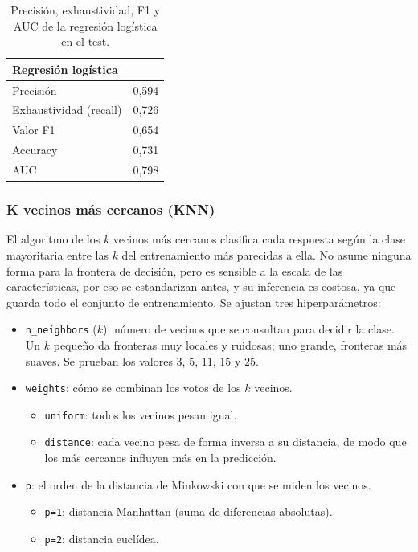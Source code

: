 \documentclass[12pt,a4paper]{report}
\theoremstyle{definition}
\newcommand{\tc}[1]{\texttt{#1}}
\begin{document}
\begin{table}[H]
\centering\small
\begin{tabular}{lc}
\toprule
Regresión logística & \\
\midrule
Precisión & 0,594 \\
Exhaustividad (recall) & 0,726 \\
Valor F1 & 0,654 \\
Accuracy & 0,731 \\
AUC & 0,798 \\
\bottomrule
\end{tabular}
\caption{Precisión, exhaustividad, F1 y AUC de la regresión logística en el test.}
\label{tab:met-lr}
\end{table}


\subsubsection{K vecinos más cercanos (KNN)}

El algoritmo de los $k$ vecinos más cercanos clasifica cada respuesta según la clase
mayoritaria entre las $k$ del entrenamiento más parecidas a ella. No
asume ninguna forma para la frontera de decisión, pero es sensible a la escala de las
características, por eso se estandarizan antes, y su inferencia es costosa, ya que guarda todo
el conjunto de entrenamiento. Se ajustan tres hiperparámetros:

\begin{itemize}
\item \tc{n\_neighbors} ($k$): número de vecinos que se consultan para decidir la clase. Un
$k$ pequeño da fronteras muy locales y ruidosas; uno grande, fronteras más suaves. Se prueban
los valores $3$, $5$, $11$, $15$ y $25$.
\item \tc{weights}: cómo se combinan los votos de los $k$ vecinos.
  \begin{itemize}
  \item \tc{uniform}: todos los vecinos pesan igual.
  \item \tc{distance}: cada vecino pesa de forma inversa a su distancia, de modo que los más
  cercanos influyen más en la predicción.
  \end{itemize}
\item \tc{p}: el orden de la distancia de Minkowski con que se miden los vecinos.
  \begin{itemize}
  \item \tc{p=1}: distancia Manhattan (suma de diferencias absolutas).
  \item \tc{p=2}: distancia euclídea.
  \end{itemize}
\end{itemize}
\end{document}
